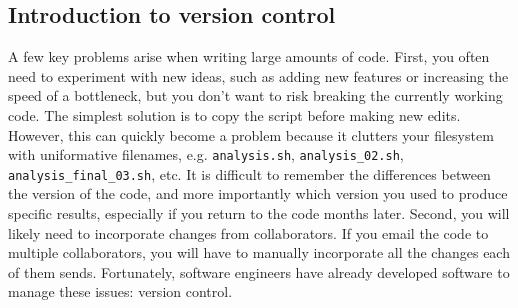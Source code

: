 \subsection{Introduction to version control}

A few key problems arise when writing large amounts of code. First, you often need to experiment with new ideas, such as adding new features or increasing the speed of a bottleneck, but you don't want to risk breaking the currently working code. The simplest solution is to copy the script before making new edits. However, this can quickly become a problem because it clutters your filesystem with uniformative filenames, e.g. \verb|analysis.sh|, \verb|analysis_02.sh|, \verb|analysis_final_03.sh|, etc. It is difficult to remember the differences between the version of the code, and more importantly which version you used to produce specific results, especially if you return to the code months later. Second, you will likely need to incorporate changes from collaborators. If you email the code to multiple collaborators, you will have to manually incorporate all the changes each of them sends. Fortunately, software engineers have already developed software to manage these issues: version control.